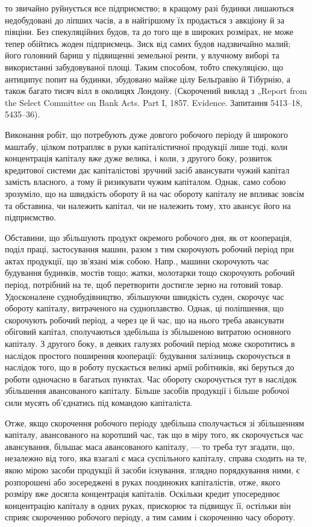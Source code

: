 \parcont{}  %
то звичайно руйнується все підприємство; в кращому разі будинки
лишаються недобудовані до ліпших часів, а в найгіршому їх продається
з авкціону й за півціни. Без спекуляційних будов, та до того ще в широких
розмірах, не може тепер обійтись жоден підприємець. Зиск від
самих будов надзвичайно малий; його головний бариш у підвищенні
земельної ренти, у влучному виборі та використанні забудовуваної площі.
Таким способом, тобто спекуляцією, що антиципує попит на будинки,
збудовано майже цілу Бельґравію й Тібурнію, а також багато тисяч вілл
в околицях Лондону. (Скорочений виклад з „Report from the Select
Committee on Bank Acts. Part I, 1857. Evidence. Запитання 5413--18,
5435--36).

Виконання робіт, що потребують дуже довгого робочого періоду й
широкого маштабу, цілком потрапляє в руки капіталістичної
продукції лише тоді, коли концентрація капіталу вже дуже велика, і
коли, з другого боку, розвиток кредитової системи дає капіталістові зручний
засіб авансувати чужий капітал замість власного, а тому й ризикувати
чужим капіталом. Однак, само собою зрозуміло, що на швидкість обороту
й на час обороту капіталу не впливає зовсім та обставина, чи належить
капітал, чи не належить тому, хто авансує його на підприємство.

Обставини, що збільшують продукт окремого робочого дня, як от кооперація,
поділ праці, застосування машин, разом з тим скорочують робочий
період при актах продукції, що зв’язані між собою. Напр., машини
скорочують час будування будинків, мостів тощо; жатки, молотарки
тощо скорочують робочий період, потрібний на те, щоб перетворити
достигле зерно на готовий товар. Удосконалене суднобудівництво, збільшуючи
швидкість суден, скорочує час обороту капіталу, витраченого на
судноплавство. Однак, ці поліпшення, що скорочують робочий період, а
через це й час, що на нього треба авансувати обіговий капітал, сполучаються
здебільша із збільшеною витратою основного капіталу. З другого
боку, в деяких галузях робочий період може скоротитись в наслідок
простого поширення кооперації: будування залізниць скорочується
в наслідок того, що в роботу пускається великі армії робітників, які
беруться до роботи одночасно в багатьох пунктах. Час обороту скорочується
тут в наслідок збільшення авансованого капіталу. Більше засобів
продукції і більше робочої сили мусять об’єднатись під командою
капіталіста.

Отже, якщо скорочення робочого періоду здебільша сполучається зі
збільшенням капіталу, авансованого на коротший час, так що в міру того,
як скорочується час авансування, більшає маса авансованого капіталу, — то
треба тут згадати, що, незалежно від того, яка взагалі є маса суспільного
капіталу, справа сходить на те, якою мірою засоби продукції й засоби
існування, зглядно порядкування ними, є розпорошені або зосереджені
в руках поодиноких капіталістів, отже, якого розміру вже
досягла концентрація капіталів. Оскільки кредит упосереднює концентрацію
капіталу в одних руках, прискорює та підвищує її, остільки він
сприяє скороченню робочого періоду, а тим самим і скороченню часу обороту.
